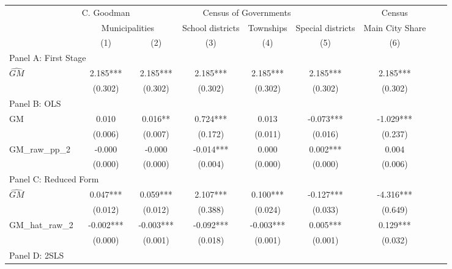  \begin{tabular}{l*{8}{c}} \toprule
&\multicolumn{1}{c}{C. Goodman}&\multicolumn{4}{c}{Census of Governments}&\multicolumn{1}{c}{Census}\\\cmidrule(lr){2-2}\cmidrule(lr){3-6}\cmidrule(lr){7-7}
&\multicolumn{2}{c}{Municipalities}&\multicolumn{1}{c}{School districts}&\multicolumn{1}{c}{Townships}&\multicolumn{1}{c}{Special districts}&\multicolumn{1}{c}{Main City Share}\\\cmidrule(lr){2-3}\cmidrule(lr){4-6}\cmidrule(lr){7-7}
&\multicolumn{1}{c}{(1)}&\multicolumn{1}{c}{(2)}&\multicolumn{1}{c}{(3)}&\multicolumn{1}{c}{(4)}&\multicolumn{1}{c}{(5)}&\multicolumn{1}{c}{(6)}\\
\cmidrule(lr){1-7}
\multicolumn{6}{l}{Panel A: First Stage}\\
\cmidrule(lr){1-7}
$\widehat{GM}$  &    2.185***&    2.185***&    2.185***&    2.185***&    2.185***&    2.185***\\
                &  (0.302)   &  (0.302)   &  (0.302)   &  (0.302)   &  (0.302)   &  (0.302)   \\
\cmidrule(lr){1-7}
\multicolumn{6}{l}{Panel B: OLS}\\
\cmidrule(lr){1-7}
GM              &    0.010   &    0.016** &    0.724***&    0.013   &   -0.073***&   -1.029***\\
                &  (0.006)   &  (0.007)   &  (0.172)   &  (0.011)   &  (0.016)   &  (0.237)   \\
\addlinespace
GM\_raw\_pp\_2     &   -0.000   &   -0.000   &   -0.014***&    0.000   &    0.002***&    0.004   \\
                &  (0.000)   &  (0.000)   &  (0.004)   &  (0.000)   &  (0.000)   &  (0.006)   \\
\cmidrule(lr){1-7}
\multicolumn{6}{l}{Panel C: Reduced Form}\\
\cmidrule(lr){1-7}
$\widehat{GM}$  &    0.047***&    0.059***&    2.107***&    0.100***&   -0.127***&   -4.316***\\
                &  (0.012)   &  (0.012)   &  (0.388)   &  (0.024)   &  (0.033)   &  (0.649)   \\
\addlinespace
GM\_hat\_raw\_2    &   -0.002***&   -0.003***&   -0.092***&   -0.003***&    0.005***&    0.129***\\
                &  (0.000)   &  (0.001)   &  (0.018)   &  (0.001)   &  (0.001)   &  (0.032)   \\
\cmidrule(lr){1-7}
\multicolumn{6}{l}{Panel D: 2SLS}\\
\cmidrule(lr){1-7}

\end{tabular}

